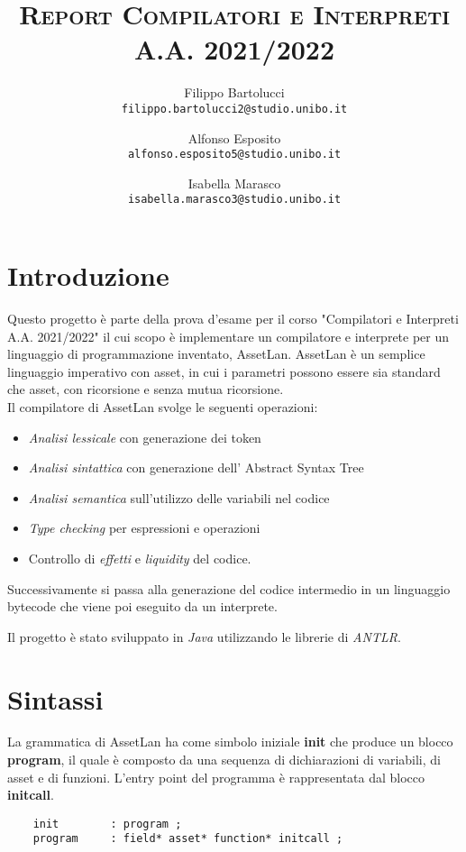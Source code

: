 \documentclass[12pt,twoside,openright,a4paper]{report}
\title{\textsc{Report Compilatori e Interpreti} \\ A.A. 2021/2022 \\ } %
\author{
  Filippo Bartolucci\\
  \texttt{filippo.bartolucci2@studio.unibo.it}
  \and
  Alfonso Esposito\\
  \texttt{alfonso.esposito5@studio.unibo.it}
  \and
  Isabella Marasco\\
  \texttt{isabella.marasco3@studio.unibo.it}
}
\date{}
\begin{document}
\maketitle

\tableofcontents

\chapter{Introduzione}

Questo progetto è parte della prova d'esame per il corso "Compilatori e Interpreti A.A. 2021/2022" il cui scopo è implementare un compilatore e interprete per un linguaggio di programmazione inventato, AssetLan. \newline
AssetLan è un semplice linguaggio imperativo con asset, in cui i parametri possono 
essere sia standard che asset, con ricorsione e senza mutua ricorsione. \\

Il compilatore di AssetLan svolge le seguenti operazioni:
\begin{itemize}
    \item \textit{Analisi lessicale} con generazione dei token
    \item \textit{Analisi sintattica} con generazione dell' Abstract Syntax Tree
    \item \textit{Analisi semantica} sull'utilizzo delle variabili nel codice
    \item \textit{Type checking} per espressioni e operazioni
    \item Controllo di \textit{effetti} e \textit{liquidity} del codice.
\end{itemize}

Successivamente si passa alla generazione del codice intermedio in un linguaggio bytecode che viene poi eseguito da un interprete.

Il progetto è stato sviluppato in \textit{Java} utilizzando le librerie di \textit{ANTLR}.

\chapter{Sintassi}

La grammatica di AssetLan ha come simbolo iniziale \textbf{init} che produce un blocco \textbf{program}, il quale è composto da una sequenza di dichiarazioni di variabili, di asset e di funzioni. L'entry point del programma è rappresentata dal blocco \textbf{initcall}.

\begin{lstlisting}
    init        : program ;
    program	    : field* asset* function* initcall ;
\end{lstlisting}
\end{document}
